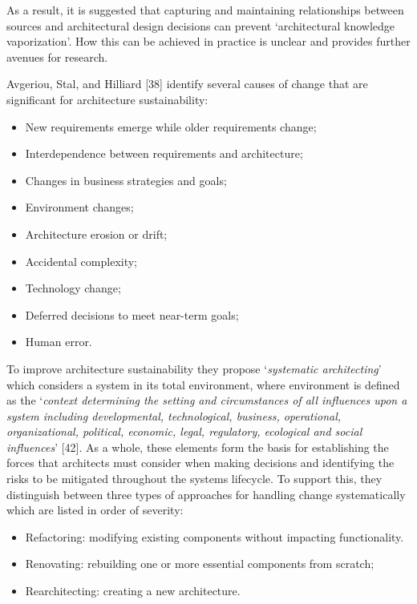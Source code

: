 \documentclass[preprint,12pt,authoryear]{elsarticle}
\begin{document}
As a result, it is suggested that capturing and maintaining
relationships between sources and architectural design decisions can
prevent `architectural knowledge vaporization'. How this can be
achieved in practice is unclear and provides further avenues for
research.

Avgeriou, Stal, and Hilliard [38] identify several causes of change
that are significant for architecture sustainability:

\begin{itemize}
\item New requirements emerge while older requirements change;
\item Interdependence between requirements and architecture;
\item Changes in business strategies and goals;
\item Environment changes;
\item Architecture erosion or drift;
\item Accidental complexity;
\item Technology change;
\item Deferred decisions to meet near-term goals;
\item Human error.
\end{itemize}

To improve architecture sustainability they propose `{\emph{systematic
architecting}}' which considers a system in its total environment, where
environment is defined as the `{\emph{context determining the setting and
circumstances of all influences upon a system including developmental,
technological, business, operational, organizational, political,
economic, legal, regulatory, ecological and social influences}}'
[42]. As a whole, these elements form the basis for establishing the
forces that architects must consider when making decisions and
identifying the risks to be mitigated throughout the systems
lifecycle. To support this, they distinguish between three types of
approaches for handling change systematically which are listed in
order of severity:

\begin{itemize}
\item Refactoring: modifying existing components without impacting
functionality.
\item Renovating: rebuilding one or more essential components from
scratch;
\item Rearchitecting: creating a new architecture.
\end{itemize}
\end{document}

